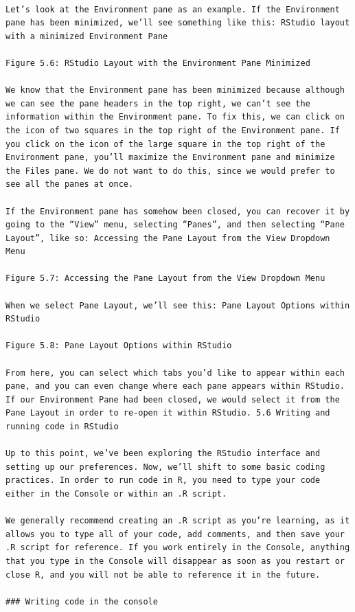 \documentclass[
  letterpaper,
  DIV=11,
  numbers=noendperiod]{scrreprt}
\begin{document}
\begin{verbatim}

Let’s look at the Environment pane as an example. If the Environment pane has been minimized, we’ll see something like this: RStudio layout with a minimized Environment Pane

Figure 5.6: RStudio Layout with the Environment Pane Minimized

We know that the Environment pane has been minimized because although we can see the pane headers in the top right, we can’t see the information within the Environment pane. To fix this, we can click on the icon of two squares in the top right of the Environment pane. If you click on the icon of the large square in the top right of the Environment pane, you’ll maximize the Environment pane and minimize the Files pane. We do not want to do this, since we would prefer to see all the panes at once.

If the Environment pane has somehow been closed, you can recover it by going to the “View” menu, selecting “Panes”, and then selecting “Pane Layout”, like so: Accessing the Pane Layout from the View Dropdown Menu

Figure 5.7: Accessing the Pane Layout from the View Dropdown Menu

When we select Pane Layout, we’ll see this: Pane Layout Options within RStudio

Figure 5.8: Pane Layout Options within RStudio

From here, you can select which tabs you’d like to appear within each pane, and you can even change where each pane appears within RStudio. If our Environment Pane had been closed, we would select it from the Pane Layout in order to re-open it within RStudio. 5.6 Writing and running code in RStudio

Up to this point, we’ve been exploring the RStudio interface and setting up our preferences. Now, we’ll shift to some basic coding practices. In order to run code in R, you need to type your code either in the Console or within an .R script.

We generally recommend creating an .R script as you’re learning, as it allows you to type all of your code, add comments, and then save your .R script for reference. If you work entirely in the Console, anything that you type in the Console will disappear as soon as you restart or close R, and you will not be able to reference it in the future.

### Writing code in the console


\end{verbatim}
\end{document}
